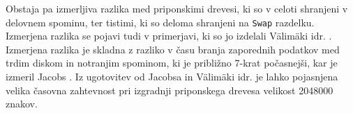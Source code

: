Obstaja pa izmerljiva razlika med priponskimi drevesi, ki so v celoti shranjeni v delovnem spominu, ter tistimi, ki so deloma shranjeni na \verb|Swap| razdelku. Izmerjena razlika se  pojavi tudi v primerjavi, ki so jo izdelali Välimäki idr. \cite{Valimaki2007}. Izmerjena razlika je skladna z razliko v času branja zaporednih podatkov med trdim diskom in notranjim spominom, ki je približno 7-krat počasnejši, kar je izmeril Jacobs \cite{Jacobs2009}. Iz ugotovitev od Jacobsa \cite{Jacobs2009} in Välimäki idr. \cite{Valimaki2007} je lahko pojasnjena velika časovna zahtevnost pri izgradnji priponskega drevesa velikost 2048000 znakov.
 
